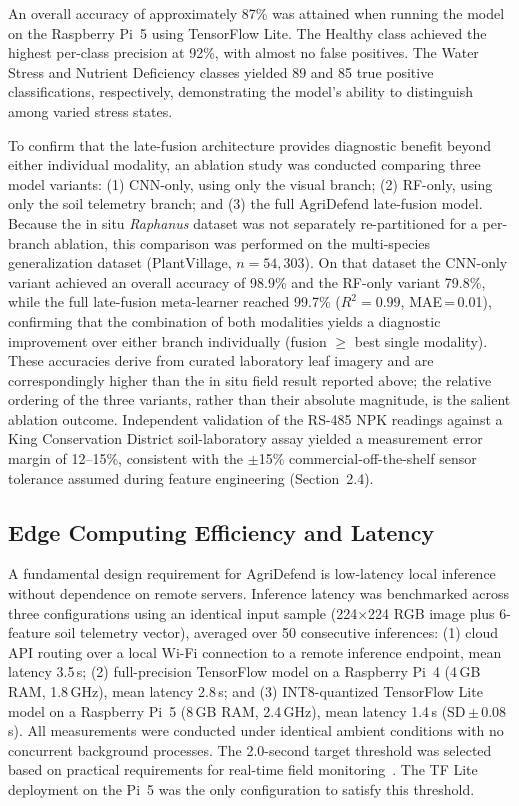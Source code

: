 \documentclass[10pt,twocolumn]{article}
\begin{document}
An overall accuracy of approximately 87\% was attained when running the model on the Raspberry Pi~5 using TensorFlow Lite.
The Healthy class achieved the highest per-class precision at 92\%, with almost no false positives.
The Water Stress and Nutrient Deficiency classes yielded 89 and 85 true positive classifications, respectively, demonstrating the model's ability to distinguish among varied stress states.

To confirm that the late-fusion architecture provides diagnostic benefit beyond either individual modality, an ablation study was conducted comparing three model variants: (1) CNN-only, using only the visual branch; (2) RF-only, using only the soil telemetry branch; and (3) the full AgriDefend late-fusion model.
Because the in situ \textit{Raphanus} dataset was not separately re-partitioned for a per-branch ablation, this comparison was performed on the multi-species generalization dataset (PlantVillage, $n = 54{,}303$). On that dataset the CNN-only variant achieved an overall accuracy of 98.9\% and the RF-only variant 79.8\%, while the full late-fusion meta-learner reached 99.7\% ($R^2 = 0.99$, MAE\,=\,0.01), confirming that the combination of both modalities yields a diagnostic improvement over either branch individually (fusion $\geq$ best single modality). These accuracies derive from curated laboratory leaf imagery and are correspondingly higher than the in situ field result reported above; the relative ordering of the three variants, rather than their absolute magnitude, is the salient ablation outcome.
Independent validation of the RS-485 NPK readings against a King Conservation District soil-laboratory assay yielded a measurement error margin of 12--15\%, consistent with the $\pm$15\% commercial-off-the-shelf sensor tolerance assumed during feature engineering (Section~2.4).

\subsection{Edge Computing Efficiency and Latency}
A fundamental design requirement for AgriDefend is low-latency local inference without dependence on remote servers.
Inference latency was benchmarked across three configurations using an identical input sample (224$\times$224 RGB image plus 6-feature soil telemetry vector), averaged over 50 consecutive inferences: (1) cloud API routing over a local Wi-Fi connection to a remote inference endpoint, mean latency 3.5\,s; (2) full-precision TensorFlow model on a Raspberry Pi~4 (4\,GB RAM, 1.8\,GHz), mean latency 2.8\,s; and (3) INT8-quantized TensorFlow Lite model on a Raspberry Pi~5 (8\,GB RAM, 2.4\,GHz), mean latency 1.4\,s (SD\,$\pm$\,0.08\,s).
All measurements were conducted under identical ambient conditions with no concurrent background processes.
The 2.0-second target threshold was selected based on practical requirements for real-time field monitoring~\cite{ref16}.
The TF Lite deployment on the Pi~5 was the only configuration to satisfy this threshold.
\end{document}
